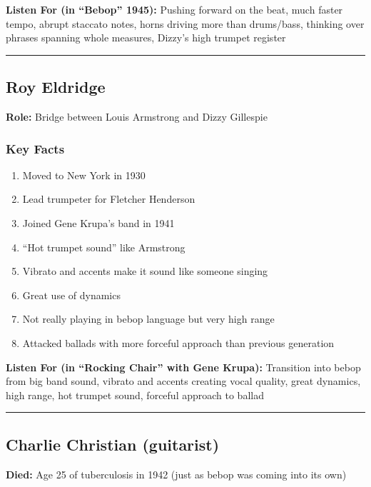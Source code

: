 \documentclass[11pt, letterpaper]{article}
\begin{document}
\textbf{Listen For (in ``Bebop'' 1945):} Pushing forward on the beat, much faster tempo, abrupt staccato notes, horns driving more than drums/bass, thinking over phrases spanning whole measures, Dizzy's high trumpet register

\bigskip
\textcolor{rulecolor}{\rule{\textwidth}{0.2pt}}

\subsection{Roy Eldridge}

\textbf{Role:} Bridge between Louis Armstrong and Dizzy Gillespie

\subsubsection*{Key Facts}
\begin{enumerate}
    \item Moved to New York in 1930
    \item Lead trumpeter for Fletcher Henderson
    \item Joined Gene Krupa's band in 1941
    \item ``Hot trumpet sound'' like Armstrong
    \item Vibrato and accents make it sound like someone singing
    \item Great use of dynamics
    \item Not really playing in bebop language but very high range
    \item Attacked ballads with more forceful approach than previous generation
\end{enumerate}

\textbf{Listen For (in ``Rocking Chair'' with Gene Krupa):} Transition into bebop from big band sound, vibrato and accents creating vocal quality, great dynamics, high range, hot trumpet sound, forceful approach to ballad

\bigskip
\textcolor{rulecolor}{\rule{\textwidth}{0.2pt}}

\subsection{Charlie Christian (guitarist)}

\textbf{Died:} Age 25 of tuberculosis in 1942 (just as bebop was coming into its own)
\end{document}

